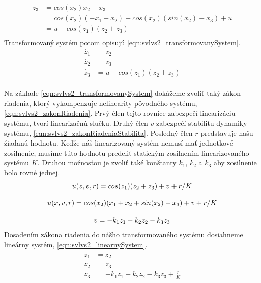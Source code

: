 \documentclass[../main.tex]{subfiles}
\begin{document}
	\begin{equation}
        \begin{aligned}
            \dot{z_3} &= cos(x_2)\dot{x_2} - \dot{x_3} \\
                      &= cos(x_2)(-x_1 -x_2) -cos(x_2)(sin(x_2) - x_3) + u \\
                      &= u - cos(z_1)(z_2+z_3) 	\\
        \end{aligned}
	\end{equation}
	Transformovaný systém potom opisujú  \cref{eqn:svlvs2_transformovanySystem}.
	\begin{equation}
		\begin{aligned}
		\dot{z_1} &=  z_2												\\
		\dot{z_2} &=  z_3												\\
		\dot{z_3} &=  u - cos(z_1)(z_2+z_3)									\\
		\end{aligned}
		\label{eqn:svlvs2_transformovanySystem}
	\end{equation}

Na základe \cref{eqn:svlvs2_transformovanySystem} dokážeme zvoliť taký zákon riadenia, ktorý vykompenzuje nelinearity pôvodného systému,  \cref{eqn:svlvs2_zakonRiadenia}. Prvý člen tejto rovnice zabezpečí linearizáciu systému, tvorí linearizačnú slučku. Druhý člen $v$ zabezpečí stabilitu dynamiky systému, \cref{eqn:svlvs2_zakonRiadeniaStabilita}. Posledný člen $r$ predstavuje našu žiadanú hodnotu. Keďže náš linearizovaný systém nemusí mať jednotkové zosilnenie, musíme túto hodnotu predeliť statickým zosilnením linearizovaného systému $K$. Druhou možnosťou je zvoliť také konštanty $k_1$, $k_2$ a $k_3$ aby zosilnenie bolo rovné jednej.
	\begin{equation}
		u(z,v,r) = cos(z_1)(z_2+z_3) + v + r/K										\\
		\label{eqn:svlvs2_zakonRiadenia}
	\end{equation}

	\begin{equation}
		u(x,v,r) = cos(x_2)(x_1 + x_2+sin(x_2) - x_3) + v + r/K										\\
		\label{eqn:svlvs2_zakonRiadeniaX}
	\end{equation}

	\begin{equation}
		v = -k_1 z_1 - k_2 z_2 -k_3 z_3										\\
		\label{eqn:svlvs2_zakonRiadeniaStabilita}
	\end{equation}
Dosadením zákona riadenia do nášho transformovaného systému dosiahneme lineárny systém, \cref{eqn:svlvs2_linearnySystem}.
	\begin{equation}
		\begin{aligned}
		\dot{z_1} &=  z_2												\\
		\dot{z_2} &=  z_3												\\
		\dot{z_3} &=   -k_1 z_1 - k_2 z_2 -k_3 z_3 + \frac{r}{K}					\\
		\end{aligned}
		\label{eqn:svlvs2_linearnySystem}
	\end{equation}
\end{document}
